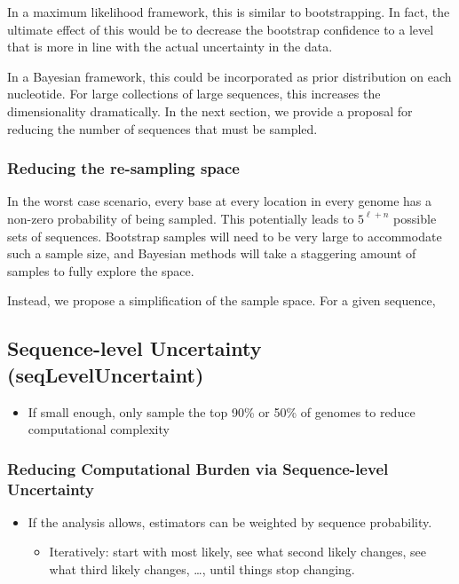 \documentclass[
]{article}
\providecommand{\tightlist}{%
  \setlength{\itemsep}{0pt}\setlength{\parskip}{0pt}}
\begin{document}
In a maximum likelihood framework, this is similar to bootstrapping. In
fact, the ultimate effect of this would be to decrease the bootstrap
confidence to a level that is more in line with the actual uncertainty
in the data.

In a Bayesian framework, this could be incorporated as prior
distribution on each nucleotide. For large collections of large
sequences, this increases the dimensionality dramatically. In the next
section, we provide a proposal for reducing the number of sequences that
must be sampled.

\hypertarget{reducing-the-re-sampling-space}{%
\subsubsection{Reducing the re-sampling
space}\label{reducing-the-re-sampling-space}}

In the worst case scenario, every base at every location in every genome
has a non-zero probability of being sampled. This potentially leads to
\(5^{\ell+n}\) possible sets of sequences. Bootstrap samples will need
to be very large to accommodate such a sample size, and Bayesian methods
will take a staggering amount of samples to fully explore the space.

Instead, we propose a simplification of the sample space. For a given
sequence,

\hypertarget{sequence-level-uncertainty-seqleveluncertaint}{%
\subsection{Sequence-level Uncertainty
(seqLevelUncertaint)}\label{sequence-level-uncertainty-seqleveluncertaint}}

\begin{itemize}
\tightlist
\item
  If small enough, only sample the top 90\% or 50\% of genomes to reduce
  computational complexity
\end{itemize}

\hypertarget{reducing-computational-burden-via-sequence-level-uncertainty}{%
\subsubsection{Reducing Computational Burden via Sequence-level
Uncertainty}\label{reducing-computational-burden-via-sequence-level-uncertainty}}

\begin{itemize}
\tightlist
\item
  If the analysis allows, estimators can be weighted by sequence
  probability.

  \begin{itemize}
  \tightlist
  \item
    Iteratively: start with most likely, see what second likely changes,
    see what third likely changes, \ldots, until things stop changing.
  \end{itemize}
\end{itemize}
\end{document}
